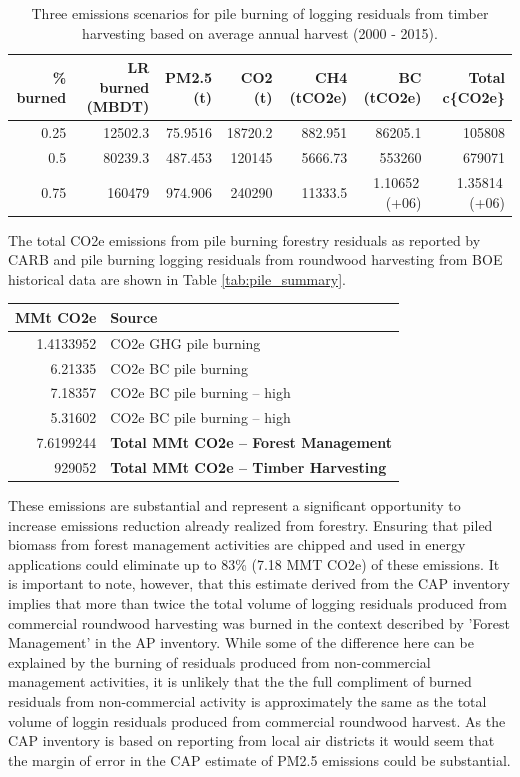 \documentclass[a4paper]{article}
\begin{document}
\begin{table}[htb]
\centering
\begin{tabular}{rrrrrrr}
\% burned & LR burned (MBDT) & PM2.5 (t) & CO2 (t) & CH4 (tCO2e) & BC (tCO2e) & Total c\{CO2e\}\\
\hline
0.25 & 12502.3 & 75.9516 & 18720.2 & 882.951 & 86205.1 & 105808\\
0.5 & 80239.3 & 487.453 & 120145 & 5666.73 & 553260 & 679071\\
0.75 & 160479 & 974.906 & 240290 & 11333.5 & 1.10652\,(+06) & 1.35814\,(+06)\\
\end{tabular}
\caption{\label{tab:orgtable3}
Three emissions scenarios for pile burning of logging residuals from timber harvesting based on average annual harvest (2000 - 2015).}

\end{table}


The total \ac{CO2e} emissions from pile burning forestry residuals as reported by \ac{CARB} and pile burning logging residuals from roundwood harvesting from \ac{BOE} historical data are shown in Table \ref{tab:pile_summary}.


\begin{center}
\begin{tabular}{rl}
MMt CO2e & Source\\
\hline
1.4133952 & \ac{CO2e} \ac{GHG} pile burning\\
6.21335 & \ac{CO2e} \ac{BC}  pile burning\\
7.18357 & \ac{CO2e} \ac{BC}  pile burning  -- high\\
5.31602 & \ac{CO2e} \ac{BC}  pile burning  -- high\\
\hline
7.6199244 & \textbf{Total MMt CO2e -- Forest Management}\\
929052 & \textbf{Total MMt CO2e -- Timber Harvesting}\\
\end{tabular}
\label{tab:orgtable4}


\end{center}
These emissions are substantial and represent a significant opportunity to increase emissions reduction already realized from forestry. Ensuring that piled biomass from forest management activities are chipped and used in energy applications could eliminate up to 83\% (7.18 MMT \ac{CO2e}) of these emissions. It is important to note, however, that this estimate derived from the \ac{CAP} inventory implies that more than twice the total volume of logging residuals produced from commercial roundwood harvesting was burned in the context described by 'Forest Management' in the \ac{AP} inventory. While some of the difference here can be explained by the burning of residuals produced from non-commercial management activities, it is unlikely that the the full compliment of burned residuals from non-commercial activity is approximately the same as the total volume of loggin residuals produced from commercial roundwood harvest. As the \ac{CAP} inventory is based on reporting from local air districts it would seem that the margin of error in the \ac{CAP} estimate of \ac{PM2.5} emissions could be substantial.
\end{document}
